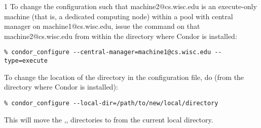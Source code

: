 \begin{ManPage}{\label{man-condor-configure}}{1}
To change the configuration such that
machine2@cs.wisc.edu is an execute-only machine
(that is, a dedicated computing node)
within a pool with central manager on machine1@cs.wisc.edu,
issue the command on that machine2@cs.wisc.edu
from within the directory where Condor is installed:
\footnotesize
\begin{verbatim}
% condor_configure --central-manager=machine1@cs.wisc.edu --type=execute
\end{verbatim}
\normalsize



To change the location of the  directory
in the configuration file, do (from the directory where Condor is installed):
\footnotesize
\begin{verbatim}
% condor_configure --local-dir=/path/to/new/local/directory
\end{verbatim}
\normalsize
This will move the ,, directories
to  from the current local directory.



\end{ManPage}
